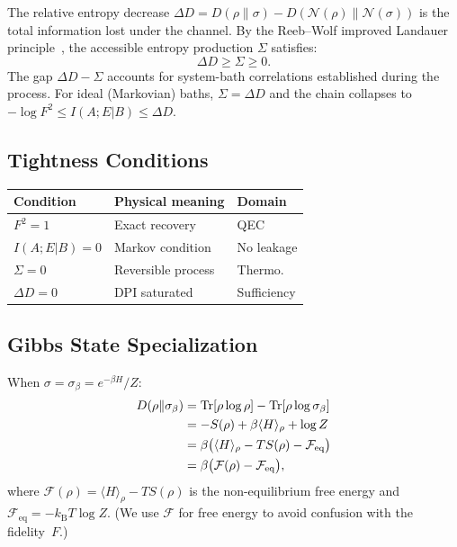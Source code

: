 \documentclass[prl,twocolumn,superscriptaddress,longbibliography]{revtex4-2}
\newcommand{\kB}{k_{\mathrm{B}}}
\newcommand{\Tr}{\mathrm{Tr}}
\newcommand{\chan}{\mathcal{N}}
\begin{document}
The relative entropy decrease $\Delta D = D(\rho\|\sigma) -
D(\chan(\rho)\|\chan(\sigma))$ is the total information lost under the
channel. By the Reeb--Wolf improved Landauer
principle~\cite{ReebWolf2014}, the accessible entropy production
$\Sigma$ satisfies:
\begin{equation}
\Delta D \geq \Sigma \geq 0.
\end{equation}
The gap $\Delta D - \Sigma$ accounts for system-bath correlations
established during the process.  For ideal (Markovian) baths,
$\Sigma = \Delta D$ and the chain collapses to
$-\log F^2 \leq I(A;E|B) \leq \Delta D$.

\subsection{Tightness Conditions}

\begin{center}
\begin{tabular}{lll}
\toprule
\textbf{Condition} & \textbf{Physical meaning} & \textbf{Domain} \\
\midrule
$F^2 = 1$ & Exact recovery & QEC \\
$I(A;E|B) = 0$ & Markov condition & No leakage \\
$\Sigma = 0$ & Reversible process & Thermo. \\
$\Delta D = 0$ & DPI saturated & Sufficiency \\
\bottomrule
\end{tabular}
\end{center}

\subsection{Gibbs State Specialization}

When $\sigma = \sigma_\beta = e^{-\beta H}/Z$:
\begin{align}
D(\rho\|\sigma_\beta) &= \Tr[\rho \log \rho] - \Tr[\rho \log
\sigma_\beta] \notag\\
&= -S(\rho) + \beta\langle H\rangle_\rho + \log Z \notag\\
&= \beta\big(\langle H\rangle_\rho - T S(\rho) - \mathcal{F}_{\mathrm{eq}}\big)
\notag\\
&= \beta\big(\mathcal{F}(\rho) - \mathcal{F}_{\mathrm{eq}}\big),
\end{align}
where $\mathcal{F}(\rho) = \langle H\rangle_\rho - T S(\rho)$ is the
non-equilibrium free energy and $\mathcal{F}_{\mathrm{eq}} = -\kB T \log Z$.
(We use $\mathcal{F}$ for free energy to avoid confusion with the
fidelity~$F$.)
\end{document}
